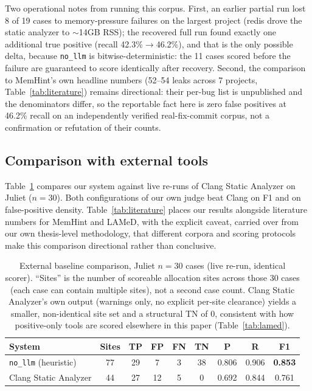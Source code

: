 \documentclass[11pt,a4paper]{article}
\begin{document}
Two operational notes from running this corpus. First, an earlier partial
run lost 8 of 19 cases to memory-pressure failures on the largest project
(redis drove the static analyzer to $\sim$14GB RSS); the recovered full
run found exactly one additional true positive (recall 42.3\%$\to$46.2\%),
and that is the only possible delta, because \texttt{no\_llm} is
bitwise-deterministic: the 11 cases scored before the failure are
guaranteed to score identically after recovery. Second, the comparison to
MemHint's own headline numbers (52--54 leaks across 7 projects,
Table~\ref{tab:literature}) remains directional: their per-bug list is
unpublished and the denominators differ, so the reportable fact here is
zero false positives at 46.2\% recall on an independently verified
real-fix-commit corpus, not a confirmation or refutation of their counts.

\subsection{Comparison with external tools}

Table~\ref{tab:external} compares our system against live re-runs of Clang
Static Analyzer on Juliet ($n{=}30$). Both configurations of our own judge
beat Clang on F1 and on false-positive density.
Table~\ref{tab:literature} places our results alongside literature numbers
for MemHint and LAMeD, with the explicit caveat, carried over from our own
thesis-level methodology, that different corpora and scoring protocols
make this comparison directional rather than conclusive.

\begin{table}[htbp]
\centering
\caption{External baseline comparison, Juliet $n{=}30$ cases (live re-run,
identical scorer). ``Sites'' is the number of scoreable allocation sites
across those 30 cases (each case can contain multiple sites), not a second
case count. Clang Static Analyzer's own output (warnings only, no explicit
per-site clearance) yields a smaller, non-identical site set and a
structural TN of 0, consistent with how positive-only tools are scored
elsewhere in this paper (Table~\ref{tab:lamed}).}
\label{tab:external}
\small
\begin{tabular}{@{}lcccccccc@{}}
\toprule
\textbf{System} & \textbf{Sites} & \textbf{TP} & \textbf{FP} & \textbf{FN} & \textbf{TN} & \textbf{P} & \textbf{R} & \textbf{F1} \\
\midrule
\texttt{no\_llm} (heuristic) & 77 & 29 & 7 & 3 & 38 & 0.806 & 0.906 & \textbf{0.853} \\
Clang Static Analyzer & 44 & 27 & 12 & 5 & 0 & 0.692 & 0.844 & 0.761 \\
\bottomrule
\end{tabular}
\end{table}
\end{document}
